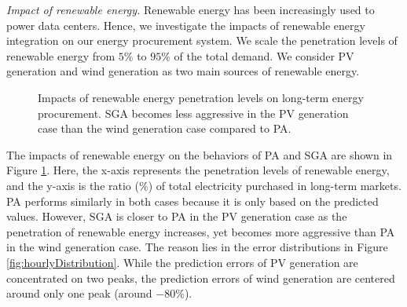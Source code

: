 \emph{Impact of renewable energy.} Renewable energy has been increasingly used to power data centers. Hence, we investigate the impacts of renewable energy integration on our energy procurement system. We scale the penetration levels of renewable energy from $5\%$ to $95\%$ of the total demand. We consider PV generation and wind generation as two main sources of renewable energy.

\begin{figure}[!ht]    
	\centering
	\vspace{-0.3cm}
	\vspace{-0.2cm}
	\caption{Impacts of renewable energy penetration levels on long-term energy procurement. SGA becomes less aggressive in the PV generation case than the wind generation case compared to PA.}
	\label{fig:renewableImpactLTEnergy}
	\vspace{-0.2cm}
\end{figure}

The impacts of renewable energy on the behaviors of PA and SGA are shown in Figure \ref{fig:renewableImpactLTEnergy}. Here, the x-axis represents the penetration levels of renewable energy, and the y-axis is the ratio (\%) of total electricity purchased in long-term markets. PA performs similarly in both cases because it is only based on the predicted values. However, SGA is closer to PA in the PV generation case as the penetration of renewable energy increases, yet becomes more aggressive than PA in the wind generation case. The reason lies in the error distributions in Figure \ref{fig:hourlyDistribution}. While the prediction errors of PV generation are concentrated on two peaks, the prediction errors of wind generation are centered around only one peak (around $-80\%$). 

